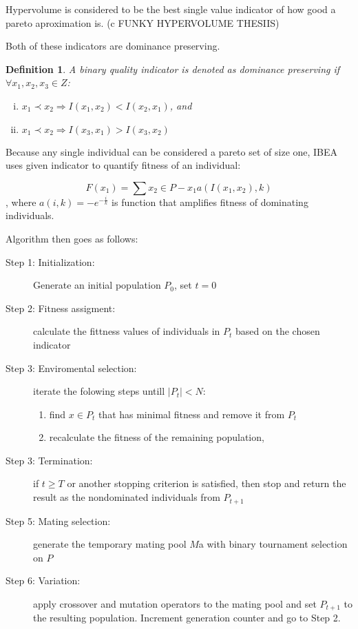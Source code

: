 \documentclass[12pt,oneside,draft]{fithesis2}
\newtheorem{defn}{Definition}
\begin{document}
Hypervolume is considered to be the best single value indicator of how good a pareto aproximation is. (c FUNKY HYPERVOLUME THESIIS) 

Both of these indicators are dominance preserving. 

\begin{defn}
A binary quality indicator is denoted as dominance preserving if $\forall x_1,x_2,x_3 \in Z$:
\begin{enumerate}[(i)]
\item  $x_1 \prec x_2 \Rightarrow I({x_1},{x_2}) < I({x_2},{x_1})$, and
\item $x_1 \prec x_2 \Rightarrow I({x_3},{x_1}) > I({x_3},{x_2})$
\end{enumerate}
\end{defn}
Because any single individual can be considered a pareto set of size one, IBEA uses given indicator to quantify fitness of an individual:

$$F(x_1) = \sum\limits{x_2 \in P - {x_1}} a(I(x_1,x_2),k)$$,
    where $a(i,k) = -e^{-\frac{i}{k}}$ is function that amplifies fitness of dominating individuals.

Algorithm then goes as follows:
\begin{description}
	\item[Step 1: Initialization:] Generate an initial population $P_0$, set $t=0$
	\item[Step 2: Fitness assigment:] calculate the fittness values of individuals in $P_t$ based on the chosen indicator
	\item[Step 3: Enviromental selection:] iterate the folowing steps untill $|P_t|< N$: 
       \begin{enumerate}
        \item find $x \in P_t$ that has minimal fitness and remove it from $P_t$
        \item recalculate the fitness of the remaining population, 
       \end{enumerate}
	\item[Step 3: Termination:] if $t \geq T$ or another stopping criterion is satisfied, then stop and return the result as the nondominated individuals from $P_{t+1}$
	\item[Step 5: Mating selection:] generate the temporary mating pool $M$a with binary tournament selection on $P$
	\item[Step 6: Variation:] apply crossover and mutation operators to the mating pool and set $P_{t+1}$ to the resulting population. Increment generation counter and go to Step 2.
\end{description}
\end{document}
